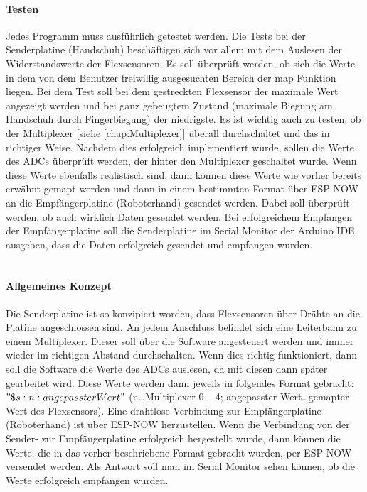 \documentclass[titlepage,12pt,twoside]{article}
\begin{document}
\paragraph{Testen}
\hfill \break
\hfill \break
Jedes Programm muss ausführlich getestet werden. Die Tests bei der Senderplatine (Handschuh) beschäftigen sich vor allem mit 
dem Auslesen der Widerstandswerte der Flexsensoren. Es soll überprüft werden, ob sich die Werte in dem von dem Benutzer 
freiwillig ausgesuchten Bereich der map Funktion liegen. Bei dem Test soll bei dem gestreckten Flexsensor der maximale Wert 
angezeigt werden und bei ganz gebeugtem Zustand (maximale Biegung am Handschuh durch Fingerbiegung) der niedrigste. Es ist 
wichtig auch zu testen, ob der Multiplexer [siehe \textcolor{blue}{\autoref{chap:Multiplexer}}] überall durchschaltet und das in richtiger Weise. Nachdem dies erfolgreich 
implementiert wurde, sollen die Werte des ADCs überprüft werden, der hinter den Multiplexer geschaltet wurde. Wenn diese Werte 
ebenfalls realistisch sind, dann können diese Werte wie vorher bereits erwähnt gemapt werden und dann in einem bestimmten Format 
über ESP-NOW an die Empfängerplatine (Roboterhand) gesendet werden. Dabei soll überprüft werden, ob auch wirklich Daten 
gesendet werden. Bei erfolgreichem Empfangen der Empfängerplatine soll die Senderplatine im Serial Monitor der Arduino IDE 
ausgeben, dass die Daten erfolgreich gesendet und empfangen wurden. \\
\\
\paragraph{Allgemeines Konzept}
\hfill \break
\hfill \break
Die Senderplatine ist so konzipiert worden, dass Flexsensoren über Drähte an die Platine angeschlossen sind. An jedem Anschluss 
befindet sich eine Leiterbahn zu einem Multiplexer. Dieser soll über die Software angesteuert werden und immer wieder im 
richtigen Abstand durchschalten. Wenn dies richtig funktioniert, dann soll die Software die Werte des ADCs auslesen, da mit 
diesen dann später gearbeitet wird. Diese Werte werden dann jeweils in folgendes Format gebracht: $"\$s:n:angepassterWert"$ 
(n…Multiplexer 0 – 4; angepasster Wert…gemapter Wert des Flexsensors). Eine drahtlose Verbindung zur Empfängerplatine 
(Roboterhand) ist über ESP-NOW herzustellen. Wenn die Verbindung von der Sender- zur Empfängerplatine erfolgreich hergestellt 
wurde, dann können die Werte, die in das vorher beschriebene Format gebracht wurden, per ESP-NOW versendet werden. Als Antwort 
soll man im Serial Monitor sehen können, ob die Werte erfolgreich empfangen wurden. \\
\\
\end{document}

